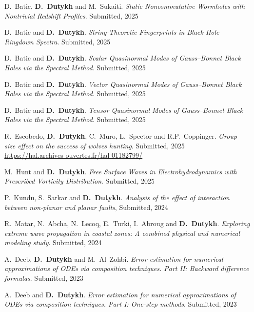 \begin{etaremune}

  \item D.~Batic, \textbf{D.~Dutykh} and M.~Sukaiti. \textit{Static Noncommutative Wormholes with Nontrivial Redshift Profiles}. Submitted, 2025 %

  \item D.~Batic and \textbf{D.~Dutykh}. \textit{String-Theoretic Fingerprints in Black Hole Ringdown Spectra}. Submitted, 2025 %

  \item D.~Batic and \textbf{D.~Dutykh}. \textit{Scalar Quasinormal Modes of Gauss--Bonnet Black Holes via the Spectral Method}. Submitted, 2025 %

  \item D.~Batic and \textbf{D.~Dutykh}. \textit{Vector Quasinormal Modes of Gauss--Bonnet Black Holes via the Spectral Method}. Submitted, 2025 %
  
  \item D.~Batic and \textbf{D.~Dutykh}. \textit{Tensor Quasinormal Modes of Gauss--Bonnet Black Holes via the Spectral Method}. Submitted, 2025 %

  \item R.~Escobedo, \textbf{D.~Dutykh}, C.~Muro, L.~Spector and R.P.~Coppinger. \textit{Group size effect on the success of wolves hunting}. Submitted, 2025 \\ %
  \url{https://hal.archives-ouvertes.fr/hal-01182799/}

  \item M.~Hunt and \textbf{D.~Dutykh}. \textit{Free Surface Waves in Electrohydrodynamics with Prescribed Vorticity Distribution}. Submitted, 2025 %

  \item P.~Kundu, S.~Sarkar and \textbf{D.~Dutykh}. \textit{Analysis of the effect of interaction between non-planar and planar faults}, Submitted, 2024 %

  \item R.~Matar, N.~Abcha, N.~Lecoq, E.~Turki, I.~Abroug and \textbf{D.~Dutykh}. \textit{Exploring extreme wave propagation in coastal zones: A combined physical and numerical modeling study}. Submitted, 2024 %

  \item A.~Deeb, \textbf{D.~Dutykh} and M.~Al~Zohbi. \textit{Error estimation for numerical approximations of ODEs via composition techniques. Part II: Backward difference formulas}. Submitted, 2023 %

  \item A.~Deeb and \textbf{D.~Dutykh}. \textit{Error estimation for numerical approximations of ODEs via composition techniques. Part I: One-step methods}. Submitted, 2023 %

\end{etaremune}

